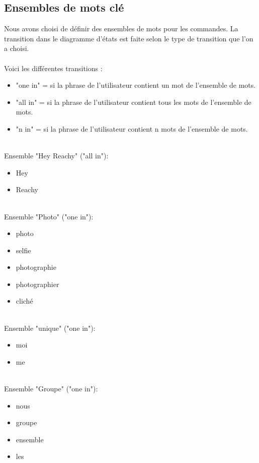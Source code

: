 \subsection{Ensembles de mots clé} \label{annexemotsclés}
Nous avons choisi de définir des ensembles de mots pour les commandes. La transition dans le diagramme d'états est faite selon le type de transition que l'on a choisi. \\ \\
Voici les différentes transitions :
\begin{itemize}
    \item {\color{red}"one in"} = si la phrase de l'utilisateur contient un mot de l'ensemble de mots.
    \item {\color{red}"all in"} = si la phrase de l'utilisateur contient tous les mots de l'ensemble de mots.
    \item {\color{red}"n in"} = si la phrase de l'utilisateur contient n mots de l'ensemble de mots.
\end{itemize}
\ \\
Ensemble "Hey Reachy" {\color{red}("all in")}:
\begin{itemize}
    \item Hey 
    \item Reachy
\end{itemize}
\ \\
Ensemble "Photo" {\color{red}("one in")}:
\begin{itemize}
    \item photo
    \item selfie
    \item photographie
    \item photographier
    \item cliché
\end{itemize} 
\ \\
Ensemble "unique" {\color{red}("one in")}:
\begin{itemize}
    \item moi
    \item me 
\end{itemize}
\ \\
Ensemble "Groupe" {\color{red}("one in")}:
\begin{itemize}
    \item nous
    \item groupe
    \item ensemble
    \item les \\
\end{itemize}


